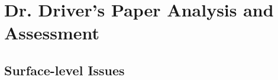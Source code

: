 \documentclass[11pt,twocolumn]{article}
\begin{document}
%
%
%


\onecolumn
\thispagestyle{empty}
\section*{Dr. Driver's Paper Analysis and Assessment}

\subsection*{Surface-level Issues}
\end{document}
